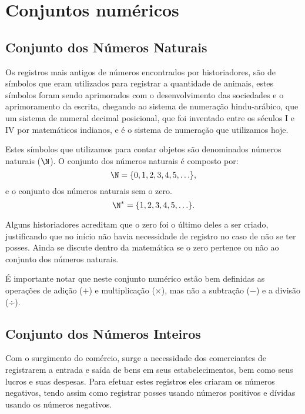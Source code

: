 
\chapter{Conjuntos numéricos}
\section{Conjunto dos Números Naturais}

Os registros mais antigos de números encontrados por historiadores, são de símbolos que eram utilizados para registrar a quantidade de animais, estes símbolos foram sendo aprimorados com o desenvolvimento das sociedades e o aprimoramento da escrita, chegando ao sistema de numeração hindu-arábico, que um sistema de numeral decimal posicional, que foi inventado entre os séculos I e IV por matemáticos indianos, e é o sistema de numeração que utilizamos hoje.

Estes símbolos que utilizamos para contar objetos são denominados números naturais ($\N$). O conjunto dos números naturais é composto por:
\begin{equation}
\N= \{0, 1, 2, 3, 4, 5, \ldots \},
\end{equation}
e o conjunto dos números naturais sem o zero.
\begin{equation}
\N^{*}= \{1, 2, 3, 4, 5, \ldots \}.
\end{equation}

Alguns historiadores acreditam que o zero foi o último deles a ser criado, justificando que no início não havia necessidade de registro no caso de não se ter posses. Ainda se discute dentro da matemática se o zero pertence ou não ao conjunto dos números naturais.

É importante notar que neste conjunto numérico estão bem definidas as operações de adição ($+$) e multiplicação ($\times$), mas não a subtração ($-$) e a divisão ($\div$).

\section{Conjunto dos Números Inteiros}

Com o surgimento do comércio, surge a necessidade dos comerciantes de registrarem a entrada e saída de bens em seus estabelecimentos, bem como seus lucros e suas despesas. Para efetuar estes registros eles criaram os números negativos, tendo assim como registrar posses usando números positivos e dívidas usando os números negativos.

